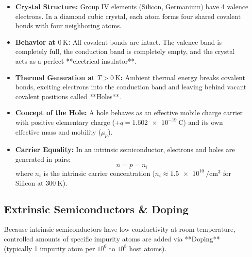 \begin{itemize}
    \item \textbf{Crystal Structure:} Group IV elements (Silicon, Germanium) have 4 valence electrons. In a diamond cubic crystal, each atom forms four shared covalent bonds with four neighboring atoms.
    \item \textbf{Behavior at $\SI{0}{\kelvin}$:} All covalent bonds are intact. The valence band is completely full, the conduction band is completely empty, and the crystal acts as a perfect **electrical insulator**.
    \item \textbf{Thermal Generation at $T > \SI{0}{\kelvin}$:} Ambient thermal energy breaks covalent bonds, exciting electrons into the conduction band and leaving behind vacant covalent positions called **Holes**.
    \item \textbf{Concept of the Hole:} A hole behaves as an effective mobile charge carrier with positive elementary charge ($+q = \SI{+1.602e-19}{\coulomb}$) and its own effective mass and mobility ($\mu_p$).
    \item \textbf{Carrier Equality:} In an intrinsic semiconductor, electrons and holes are generated in pairs:
    \begin{equation}
        n = p = n_i
    \end{equation}
    where $n_i$ is the intrinsic carrier concentration ($n_i \approx \SI{1.5e10}{\per\centi\meter\cubed}$ for Silicon at $\SI{300}{\kelvin}$).
\end{itemize}

\subsection{Extrinsic Semiconductors \& Doping}
Because intrinsic semiconductors have low conductivity at room temperature, controlled amounts of specific impurity atoms are added via **Doping** (typically 1 impurity atom per $10^6$ to $10^8$ host atoms).

